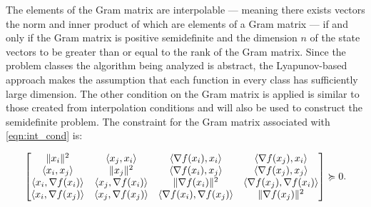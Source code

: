 The elements of the Gram matrix are interpolable --- meaning there exists vectors the norm and inner product of which are elements of a Gram matrix --- if and only if the Gram matrix is positive semidefinite and the dimension $n$ of the state vectors to be greater than or equal to the rank of the Gram matrix. Since the problem classes the algorithm being analyzed is abstract, the Lyapunov-based approach makes the assumption that each function in every class has sufficiently large dimension. The other condition on the Gram matrix is applied is similar to those created from interpolation conditions and will also be used to construct the semidefinite problem. The constraint for the Gram matrix associated with \eqref{eqn:int_cond} is:

\begin{equation} \label{eqn:trans_cond}
	\begin{bmatrix}\|x_i\|^2 & \langle x_j, x_i \rangle & \langle \nabla f(x_i), x_i \rangle & \langle \nabla f(x_j), x_i \rangle\\ \langle x_i, x_j \rangle & \|x_j\|^2 & \langle \nabla f(x_i), x_j \rangle & \langle \nabla f(x_j), x_j \rangle \\ \langle x_i, \nabla f(x_i) \rangle & \langle x_j, \nabla f(x_i) \rangle & \|\nabla f(x_i)\|^2 & \langle \nabla f(x_j), \nabla f(x_i) \rangle \\ \langle x_i, \nabla f(x_j) \rangle & \langle x_j, \nabla f(x_j) \rangle & \langle \nabla f(x_i), \nabla f(x_j) \rangle & \|\nabla f(x_j)\|^2\end{bmatrix} \succcurlyeq 0.
\end{equation}


